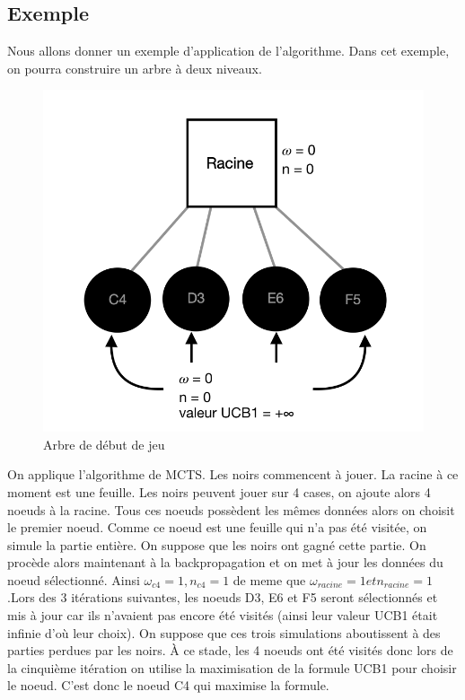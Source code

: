 \documentclass[12pt]{article}
\begin{document}
\subsection{Exemple}
Nous allons donner un exemple d’application de l’algorithme. Dans cet exemple, on
pourra construire un arbre à deux niveaux.
\begin{figure}[h!]
		\centering
		\includegraphics[width = 1\textwidth]{images/exem1.png}
		\caption{Arbre de début de jeu}
		\label{eq1}
	\end{figure}
	\newpage
On applique l’algorithme de MCTS. Les noirs commencent à jouer. La racine à ce
moment est une feuille. Les noirs peuvent jouer sur 4 cases, on ajoute alors 4 noeuds à la
racine. Tous ces noeuds possèdent les mêmes données alors on choisit le premier
noeud. Comme ce noeud est une feuille qui n’a pas été visitée, on simule la partie entière.
On suppose que les noirs ont gagné cette partie. On procède alors maintenant à la
backpropagation et on met à jour les données du noeud sélectionné. Ainsi $ \omega_{c4} = 1 , n_{c4} = 1 $ de meme que $ \omega_{racine} =1  et n_{racine} = 1 $.Lors des 3 itérations suivantes, les noeuds D3, E6
et F5 seront sélectionnés et mis à jour car ils n’avaient pas encore été visités (ainsi leur
valeur UCB1 était infinie d’où leur choix). On suppose que ces trois simulations
aboutissent à des parties perdues par les noirs. À ce stade, les 4 noeuds ont été visités
donc lors de la cinquième itération on utilise la maximisation de la formule UCB1 pour
choisir le noeud. C’est donc le noeud C4 qui maximise la formule.
\end{document}
